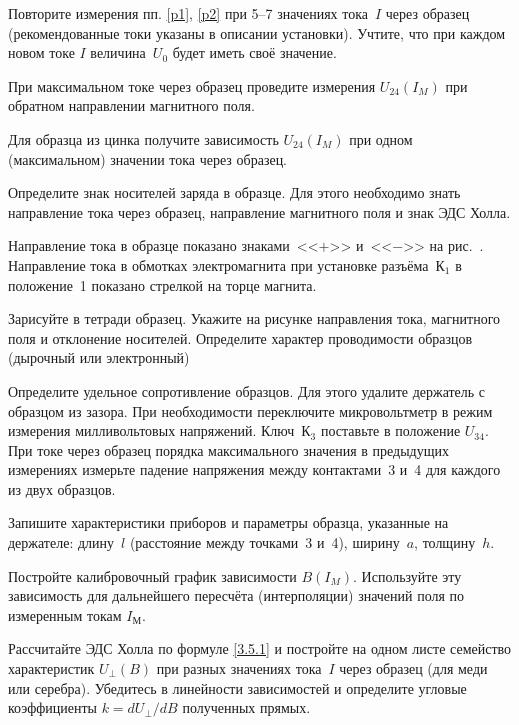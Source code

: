 \begin{lab:task}
\item Повторите измерения пп. \ref{p1}, \ref{p2} при 5--7 значениях тока~$I$ через образец
(рекомендованные токи указаны в описании установки).  
Учтите, что при каждом новом токе $I$ величина~$U_0$ будет иметь 
своё значение.

\item При максимальном токе через образец проведите измерения $U_{24}(I_{M})$ 
при обратном направлении магнитного поля.

\item Для образца из цинка получите зависимость $U_{24}(I_{M})$ при одном 
(максимальном) значении тока через образец.

\item Определите знак носителей заряда в образце. Для этого необходимо знать
направление тока через образец, направление магнитного поля и знак ЭДС Холла.

Направление тока в образце показано знаками~<<$+$>> и~<<$-$>> на
рис.~. Направление тока в обмотках электромагнита при 
установке разъёма~К$_1$ в положение~1 показано стрелкой на торце магнита.

Зарисуйте в тетради образец. Укажите на рисунке направления тока, магнитного
поля и отклонение носителей. Определите характер проводимости образцов
(дырочный или электронный)

\item Определите удельное сопротивление образцов. Для этого удалите держатель с
образцом из зазора. При необходимости переключите микровольтметр 
в режим измерения милливольтовых напряжений. Ключ~К$_3$ поставьте 
в положение $U_{34}$. При токе через образец порядка максимального 
значения в предыдущих измерениях измерьте падение напряжения между 
контактами~3 и~4 для каждого из двух образцов.

\item Запишите характеристики приборов и параметры образца, указанные на держателе:
длину~$l$ (расстояние между точками~3 и~4), ширину~$a$, толщину~$h$.


\item Постройте калибровочный график зависимости $B(I_{M})$. 
Используйте эту зависимость для дальнейшего пересчёта (интерполяции)
значений поля по измеренным токам $I_{М}$.

\item Рассчитайте ЭДС Холла по формуле \eqref{3.5.1} и постройте на одном листе
семейство характеристик $U_{\perp}(B)$ при разных значениях тока~$I$ через
образец (для меди или серебра). 
Убедитесь в линейности зависимостей и определите угловые 
коэффициенты $k=dU_{\perp}/dB$ полученных прямых.


\end{lab:task}
